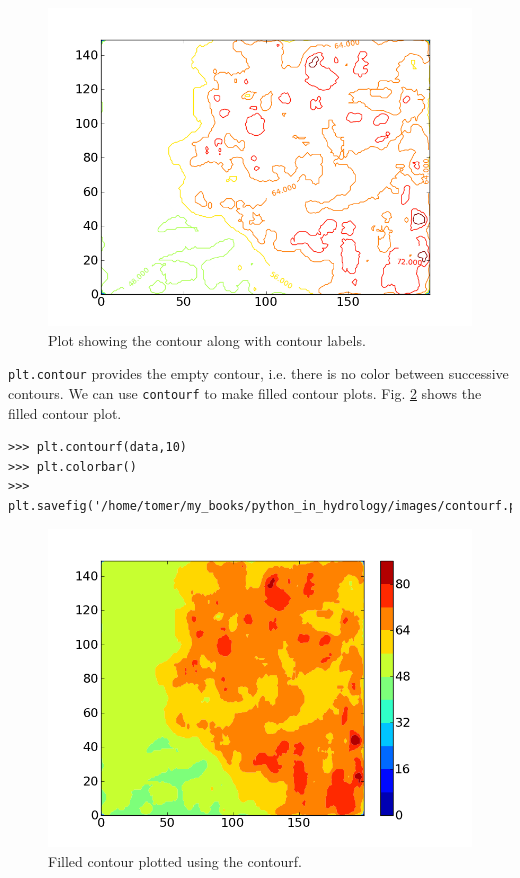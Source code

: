 \documentclass[10pt]{book}
\begin{document}
\beforefig
\begin{figure}[h!]
  \centering
    \includegraphics[scale=0.5]{images/contour.png}
  \caption{Plot showing the contour along with contour labels.}
   \label{fig:contour}
\end{figure}
\afterfig

\verb"plt.contour" provides the empty contour, i.e. there is no color between successive contours. We can use \verb"contourf" to make filled contour plots. Fig. \ref{fig:contourf} shows the filled contour plot. 
\beforeverb
\begin{verbatim}
>>> plt.contourf(data,10)
>>> plt.colorbar()
>>> plt.savefig('/home/tomer/my_books/python_in_hydrology/images/contourf.png')
\end{verbatim}
\afterverb
{}

\beforefig
\begin{figure}[h!]
  \centering
    \includegraphics[scale=0.5]{images/contourf.png}
  \caption{Filled contour plotted using the contourf.}
   \label{fig:contourf}
\end{figure}
\afterfig
\end{document}
